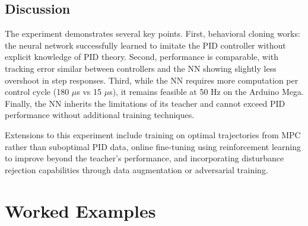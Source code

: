 \subsection{Discussion}

The experiment demonstrates several key points. First, behavioral cloning works: the neural network successfully learned to imitate the PID controller without explicit knowledge of PID theory. Second, performance is comparable, with tracking error similar between controllers and the NN showing slightly less overshoot in step responses. Third, while the NN requires more computation per control cycle (180 $\mu$s vs 15 $\mu$s), it remains feasible at 50 Hz on the Arduino Mega. Finally, the NN inherits the limitations of its teacher and cannot exceed PID performance without additional training techniques.

Extensions to this experiment include training on optimal trajectories from MPC rather than suboptimal PID data, online fine-tuning using reinforcement learning to improve beyond the teacher's performance, and incorporating disturbance rejection capabilities through data augmentation or adversarial training.


\section{Worked Examples}

